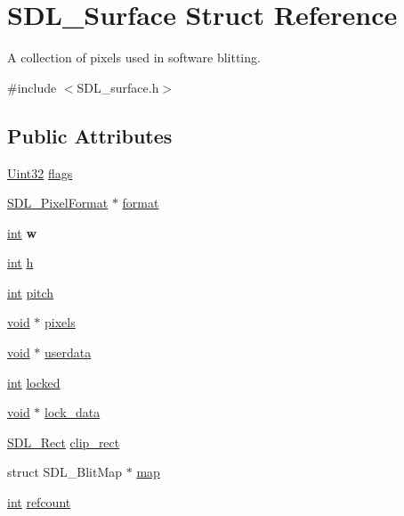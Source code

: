 \hypertarget{structSDL__Surface}{}\section{S\+D\+L\+\_\+\+Surface Struct Reference}
\label{structSDL__Surface}


A collection of pixels used in software blitting.  




{\ttfamily \#include $<$S\+D\+L\+\_\+surface.\+h$>$}

\subsection*{Public Attributes}
\begin{DoxyCompactItemize}
\item 
\hyperlink{SDL__stdinc_8h_add440eff171ea5f55cb00c4a9ab8672d}{Uint32} \hyperlink{structSDL__Surface_a86d78b665d5dfd7aa1dd9696b067641b}{flags}
\item 
\hyperlink{structSDL__PixelFormat}{S\+D\+L\+\_\+\+Pixel\+Format} $\ast$ \hyperlink{structSDL__Surface_a0a90721f947c10c3b79e02ccb419ca62}{format}
\item 
\hypertarget{structSDL__Surface_a9b0ec7185dcdb2a3530a9160a6ea83d9}{}\hyperlink{SDL__thread_8h_a6a64f9be4433e4de6e2f2f548cf3c08e}{int} {\bfseries w}\label{structSDL__Surface_a9b0ec7185dcdb2a3530a9160a6ea83d9}

\item 
\hyperlink{SDL__thread_8h_a6a64f9be4433e4de6e2f2f548cf3c08e}{int} \hyperlink{structSDL__Surface_af33bcf87a1f5e10a99b3c7e8626b38c8}{h}
\item 
\hyperlink{SDL__thread_8h_a6a64f9be4433e4de6e2f2f548cf3c08e}{int} \hyperlink{structSDL__Surface_a5fa37325d77d65b2ed64ffc7cd01bb6c}{pitch}
\item 
\hyperlink{SDL__audio_8h_a52835ae37c4bb905b903cbaf5d04b05f}{void} $\ast$ \hyperlink{structSDL__Surface_abd9597e0e084b8ef33fe0397bc26d911}{pixels}
\item 
\hyperlink{SDL__audio_8h_a52835ae37c4bb905b903cbaf5d04b05f}{void} $\ast$ \hyperlink{structSDL__Surface_ae66d973dcb9b57cb34815892e1ee1f31}{userdata}
\item 
\hyperlink{SDL__thread_8h_a6a64f9be4433e4de6e2f2f548cf3c08e}{int} \hyperlink{structSDL__Surface_a5022edaeea1c0a055fa5d6dccba41de2}{locked}
\item 
\hyperlink{SDL__audio_8h_a52835ae37c4bb905b903cbaf5d04b05f}{void} $\ast$ \hyperlink{structSDL__Surface_a0afacfb933b54a9af0846a307a6924fb}{lock\+\_\+data}
\item 
\hyperlink{structSDL__Rect}{S\+D\+L\+\_\+\+Rect} \hyperlink{structSDL__Surface_aa9a0da3b38261dad6cf0cc4e3bb5b0c3}{clip\+\_\+rect}
\item 
struct S\+D\+L\+\_\+\+Blit\+Map $\ast$ \hyperlink{structSDL__Surface_a8c1ecad399b0d4f525b1a53b6ee9393f}{map}
\item 
\hyperlink{SDL__thread_8h_a6a64f9be4433e4de6e2f2f548cf3c08e}{int} \hyperlink{structSDL__Surface_a03d10628a359c0674f5ceffd574f1641}{refcount}
\end{DoxyCompactItemize}


